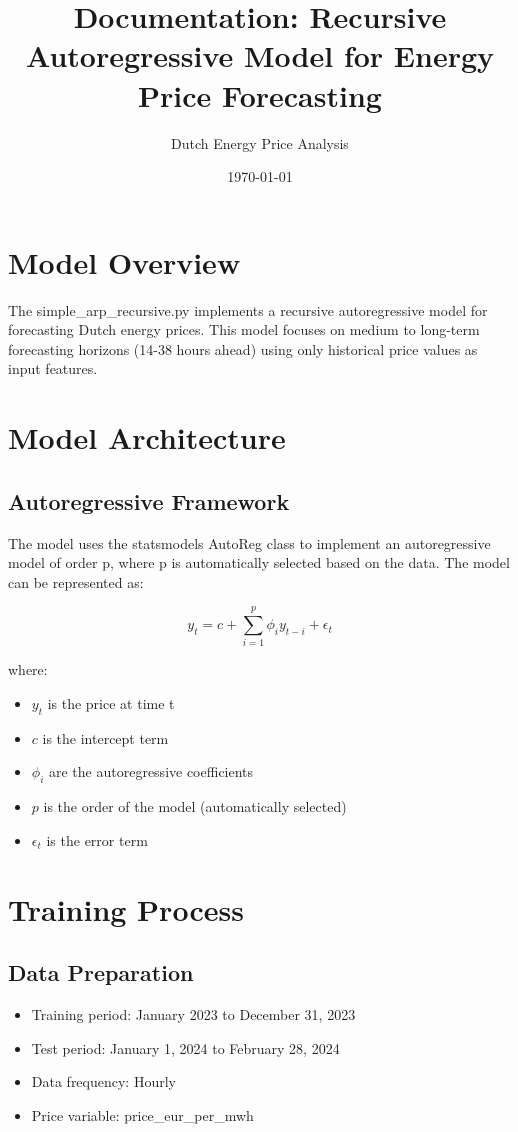\documentclass{article}
\title{Documentation: Recursive Autoregressive Model for Energy Price Forecasting}
\author{Dutch Energy Price Analysis}
\date{\today}
\begin{document}
\maketitle

\section{Model Overview}
The simple_arp_recursive.py implements a recursive autoregressive model for forecasting Dutch energy prices. This model focuses on medium to long-term forecasting horizons (14-38 hours ahead) using only historical price values as input features.

\section{Model Architecture}

\subsection{Autoregressive Framework}
The model uses the statsmodels AutoReg class to implement an autoregressive model of order p, where p is automatically selected based on the data. The model can be represented as:

\begin{equation}
y_t = c + \sum_{i=1}^{p} \phi_i y_{t-i} + \epsilon_t
\end{equation}

where:
\begin{itemize}
    \item $y_t$ is the price at time t
    \item $c$ is the intercept term
    \item $\phi_i$ are the autoregressive coefficients
    \item $p$ is the order of the model (automatically selected)
    \item $\epsilon_t$ is the error term
\end{itemize}

\section{Training Process}

\subsection{Data Preparation}
\begin{itemize}
    \item Training period: January 2023 to December 31, 2023
    \item Test period: January 1, 2024 to February 28, 2024
    \item Data frequency: Hourly
    \item Price variable: price_eur_per_mwh
\end{itemize}
\end{document}
